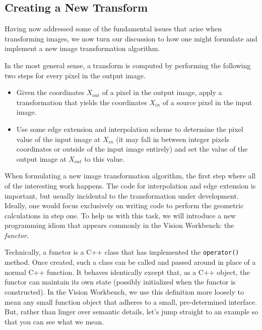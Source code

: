 \subsection{Creating a New Transform}

Having now addressed some of the fundamental issues that arise when
transforming images, we now turn our discussion to how one might
formulate and implement a new image transformation algorithm.

In the most general sense, a transform is computed by performing the
following two steps for every pixel in the output image.

\begin{itemize}
\item Given the coordinates $X_{out}$ of a pixel in the output image,
  apply a transformation that yields the coordinates $X_{in}$ of a
  source pixel in the input image.  
\item Use some edge extension and interpolation scheme to determine
  the pixel value of the input image at $X_{in}$ (it may fall in
  between integer pixels coordinates or outside of the input image
  entirely) and set the value of the output image at $X_{out}$ to this
  value.
\end{itemize} 

When formulating a new image transformation algorithm, the first step
where all of the interesting work happens.  The code for interpolation
and edge extension is important, but usually incidental to the
transformation under development.  Ideally, one would focus
exclusively on writing code to perform the geometric calculations in
step one.  To help us with this task, we will introduce a new
programming idiom that appears commonly in the Vision Workbench: the
{\em functor}.

Technically, a functor is a C++ class that has implemented the
\verb#operator()# method.  Once created, such a class can be called
and passed around in place of a normal C++ function.  It behaves
identically except that, as a C++ object, the functor can maintain its
own state (possibly initialized when the functor is constructed).  In
the Vision Workbench, we use this definition more loosely to mean any
small function object that adheres to a small, pre-determined
interface.  But, rather than linger over semantic details, let's
jump straight to an example so that you can see what we mean.



